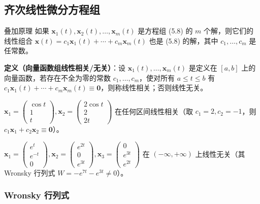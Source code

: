 \subsection{齐次线性微分方程组}

\begin{myTheorem}{叠加原理}
如果 $\mathbf{x}_1(t), \mathbf{x}_2(t), \ldots, \mathbf{x}_m(t)$ 是方程组 (5.8) 的 $m$ 个解，则它们的线性组合 $\mathbf{x}(t) = c_1\mathbf{x}_1(t) + \cdots + c_m\mathbf{x}_m(t)$ 也是 (5.8) 的解，其中 $c_1, \ldots, c_m$ 是任常数。
\end{myTheorem}

\textbf{定义（向量函数组线性相关/无关）}：设 $\mathbf{x}_1(t), \ldots, \mathbf{x}_m(t)$ 是定义在 $[a,b]$ 上的向量函数，若存在不全为零的常数 $c_1, \ldots, c_m$，使对所有 $a \le t \le b$ 有 $c_1\mathbf{x}_1(t) + \cdots + c_m\mathbf{x}_m(t) \equiv \mathbf{0}$，则称线性相关；否则线性无关。

\begin{example}
$\mathbf{x}_1 = \begin{pmatrix} \cos t \\ 1 \\ t \end{pmatrix}, \mathbf{x}_2 = \begin{pmatrix} 2\cos t \\ 2 \\ 2t \end{pmatrix}$ 在任何区间线性相关（取 $c_1 = 2, c_2 = -1$，则 $c_1\mathbf{x}_1 + c_2\mathbf{x}_2 \equiv \mathbf{0}$）。
\end{example}

\begin{example}
$\mathbf{x}_1 = \begin{pmatrix} e^t \\ e^{-t} \\ 0 \end{pmatrix}, \mathbf{x}_2 = \begin{pmatrix} e^{2t} \\ 0 \\ e^{3t} \end{pmatrix}, \mathbf{x}_3 = \begin{pmatrix} 0 \\ e^{3t} \\ e^{2t} \end{pmatrix}$ 在 $(-\infty, +\infty)$ 上线性无关（其 Wronsky 行列式 $W = -e^{7t} - e^{3t} \neq 0$）。
\end{example}

\subsubsection{Wronsky 行列式}

